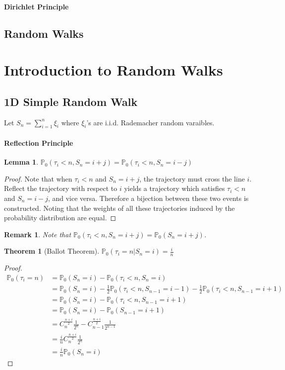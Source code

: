 \documentclass{article}
\newtheorem{Thm}{Theorem}[section]
\newtheorem{Lem}{Lemma}[section]
\newtheorem*{Rk}{Remark}
\theoremstyle{definition}
\newcommand{\PP}{\mathbb{P}}
\newcommand{\<}{\left\langle}
\renewcommand{\>}{\right\rangle}
\begin{document}
\paragraph{Dirichlet Principle}

\subsection{Random Walks}


\section{Introduction to Random Walks}
\subsection{1D Simple Random Walk}
Let $S_n=\sum_{i=1}^{n}\xi_i$ where $\xi_i$'s are i.i.d. Rademacher random varaibles.
\paragraph{Reflection Principle}
\begin{Lem}
$\PP_0(\tau_i< n,S_n=i+j)=\PP_0(\tau_i< n,S_n=i-j)$
\end{Lem}
\begin{proof}
    Note that when $\tau_i<n$ and $S_n=i+j$, the trajectory must cross the line $i$. 
    Reflect the trajectory with respect to $i$ yields a trajectory which satisfies $\tau_i<n$ and $S_n=i-j$, and vice versa.
    Therefore a bijection between these two events is constructed. 
    Noting that the weights of all these trajectories induced by the probability distribution are equal.
\end{proof}
\begin{Rk}
    Note that $\PP_0(\tau_i< n,S_n=i+j)=\PP_0(S_n=i+j)$.
\end{Rk}

\begin{Thm}[Ballot Theorem]
    $\PP_0(\tau_i=n|S_n=i)=\frac{i}{n}$
\end{Thm}
\begin{proof}
    \begin{align*}
        \PP_0(\tau_i=n)&=\PP_0(S_n=i)-\PP_0(\tau_i<n,S_n=i)\\
                    &=\PP_0(S_n=i)-\frac{1}{2}\PP_0(\tau_i<n,S_{n-1}=i-1)-\frac{1}{2}\PP_0(\tau_i<n,S_{n-1}=i+1)\\
                    &=\PP_0(S_n=i)-\PP_0(\tau_i<n,S_{n-1}=i+1)\\
                    &=\PP_0(S_n=i)-\PP_0(S_{n-1}=i+1)\\
                    &=C_{n}^{\frac{n+i}{2}}\frac{1}{2^n}-C_{n-1}^{\frac{n+i}{2}}\frac{1}{2^{n-1}}\\
                    &=\frac{i}{n}C_{n}^{\frac{n+i}{2}}\frac{1}{2^n}\\
                    &=\frac{i}{n}\PP_0(S_n=i)
    \end{align*}
\end{proof}
\end{document}
